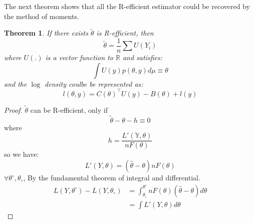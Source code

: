 \documentclass[a4paper,12pt, oneside, fleqn]{book}
\newtheorem{theorem}{Theorem}[section]
\theoremstyle{definition}
\theoremstyle{remark}
\begin{document}
The next theorem shows that all the R-efficient estimator could be recovered by the method of moments.

\begin{theorem}
	If there exists $\tilde{\theta}$ is R-efficient, then 
	\begin{equation}
		\tilde{\theta} = \frac{1}{n}\sum U(Y_i)
	\end{equation}
	where $U(.)$ is a vector function to $\mathbb{R}$ and satisfies:
	\begin{equation*}
		\int U(y) p(\theta, y) d\mu \equiv \theta
	\end{equation*}
	and the $\log$ density coulbe be represented as:
	\begin{equation*}
		l(\theta, y) = C(\theta)^\top U(y) - B(\theta) + l(y)
	\end{equation*}
\end{theorem}

\begin{proof}
	$\tilde{\theta}$ can be R-efficient, only if 
	\begin{equation*}
		\tilde{\theta} - \theta - h \equiv 0
	\end{equation*}
	where
	\begin{equation*}
		h = \frac{L'(\mathbb{Y}, \theta)}{nF(\theta)}
	\end{equation*} 
	so we have:
	\begin{equation*}
		L'(Y,\theta) = (\hat{\theta} - \theta) n F(\theta)
	\end{equation*}
	$\forall \theta^\circ, \theta_\circ$, By the fundamental theorem of integral and differential.
	\begin{align*}
		L(Y,\theta^\circ) - L(Y, \theta_\circ) &= \int_{\theta_\circ}^{\theta^\circ}n F(\theta)(\hat{\theta} - \theta)d\theta \\
		&= \int L'(Y,\theta)d\theta
	\end{align*}
\end{proof}
\end{document}

